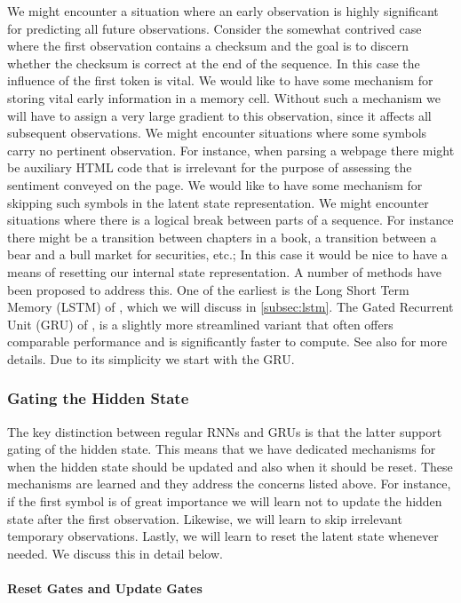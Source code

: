 We might encounter a situation where an early observation is highly significant for predicting all future observations. Consider the somewhat contrived case where the first observation contains a checksum and the goal is to discern whether the checksum is correct at the end of the sequence. In this case the influence of the first token is vital. We would like to have some mechanism for storing vital early information in a memory cell. Without such a mechanism we will have to assign a very large gradient to this observation, since it affects all subsequent observations.
We might encounter situations where some symbols carry no pertinent observation. For instance, when parsing a webpage there might be auxiliary HTML code that is irrelevant for the purpose of assessing the sentiment conveyed on the page. We would like to have some mechanism for skipping such symbols in the latent state representation.
We might encounter situations where there is a logical break between parts of a sequence. For instance there might be a transition between chapters in a book, a transition between a bear and a bull market for securities, etc.; In this case it would be nice to have a means of resetting our internal state representation.
A number of methods have been proposed to address this. One of the earliest is the Long Short Term Memory (LSTM) of \citep{Hochreiter1997}, which we will discuss in \cref{subsec:lstm}. The Gated Recurrent Unit (GRU) of \citet{Cho2014}, is a slightly more streamlined variant that often offers comparable performance and is significantly faster to compute. See also \citep{Chung2014} for more details. Due to its simplicity we start with the GRU.

\subsubsection{Gating the Hidden State}

The key distinction between regular RNNs and GRUs is that the latter support gating of the hidden state. This means that we have dedicated mechanisms for when the hidden state should be updated and also when it should be reset. These mechanisms are learned and they address the concerns listed above. For instance, if the first symbol is of great importance we will learn not to update the hidden state after the first observation. Likewise, we will learn to skip irrelevant temporary observations. Lastly, we will learn to reset the latent state whenever needed. We discuss this in detail below.

\paragraph{Reset Gates and Update Gates}

